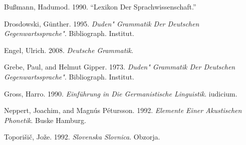 \documentclass[
  letterpaper,
]{scrbook}
\newlength{\cslhangindent}
\newlength{\cslentryspacingunit} %
\newenvironment{CSLReferences}[2] %
 {%
  \setlength{\parindent}{0pt}
  \ifodd #1
  \let\oldpar\par
  \def\par{\hangindent=\cslhangindent\oldpar}
  \fi
  \setlength{\parskip}{#2\cslentryspacingunit}
 }%
 {}
\begin{document}

\hypertarget{refs}{}
\begin{CSLReferences}{1}{0}
\leavevmode{}%
Bußmann, Hadumod. 1990. {``Lexikon Der Sprachwissenschaft.''}

\leavevmode{}%
Drosdowski, Günther. 1995. \emph{Duden" Grammatik Der Deutschen
Gegenwartssprache"}. Bibliograph. Institut.

\leavevmode{}%
Engel, Ulrich. 2008. \emph{Deutsche Grammatik}.

\leavevmode{}%
Grebe, Paul, and Helmut Gipper. 1973. \emph{Duden" Grammatik Der
Deutschen Gegenwartssprache"}. Bibliograph. Institut.

\leavevmode{}%
Gross, Harro. 1990. \emph{Einf{ü}hrung in Die Germanistische
Linguistik}. iudicium.

\leavevmode{}%
Neppert, Joachim, and Magnús Pétursson. 1992. \emph{Elemente Einer
Akustischen Phonetik}. Buske Hamburg.

\leavevmode{}%
Toporišič, Jože. 1992. \emph{Slovenska Slovnica}. Obzorja.

\end{CSLReferences}


\backmatter

\printindex
\end{document}

